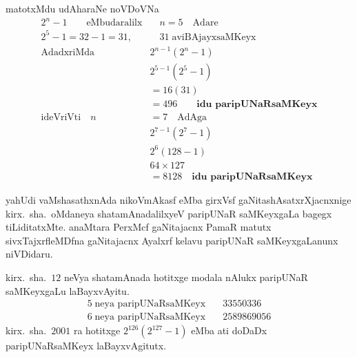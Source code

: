 matotxMdu udAharaNe noVDoVNa
\begin{align*}
2^{n}-1 \qquad\text{eMbudaralilx}& \quad n=5 \quad\text{Adare}\\
2^{5}-1 = 32-1 = 31, &\quad 31\; \text{aviBAjayxsaMKeyx}\\
\text{AdadxriMda}\quad &2^{n-1}(2^{n}-1)\\
&2^{5-1}(2^{5}-1)\\
&= 16(31)\\ 
&= 496 \qquad\textbf{idu paripUNaRsaMKeyx}\\[0.1cm]  %
\text{ideVriVti}\quad n&=7 \quad\text{AdAga}\\
&2^{7-1}(2^{7}-1)\\
&2^{6}(128-1)\\
&64\times 127\\
&=8128 \quad\textbf{idu paripUNaRsaMKeyx}
\end{align*}

yahUdi vaMshasathxnAda nikoVmAkasf eMba girxVsf gaNitashAsatxrXjacnxnige kirx.~sha.\ oMdaneya shatamAnadalilxyeV paripUNaR saMKeyxgaLa bagegx tiLiditatxMte. anaMtara PerxMcf gaNitajacnx  PamaR matutx sivxTajxrfleMDfna gaNitajacnx Ayalxrf kelavu paripUNaR saMKeyxgaLanunx niVDidaru. 

kirx.~sha.\ $12$ neVya shatamAnada hotitxge modala nAlukx paripUNaR saMKeyxgaLu laBayxvAyitu.
\begin{align*}
5\;\text{neya paripUNaRsaMKeyx} \quad &33550336\\
6\;\text{neya paripUNaRsaMKeyx} \quad &2589869056
\end{align*}
kirx.~sha.\ $2001$ ra hotitxge $2^{126}(2^{127}-1)$ eMba ati doDaDx paripUNaRsaMKeyx laBayxvAgitutx.
